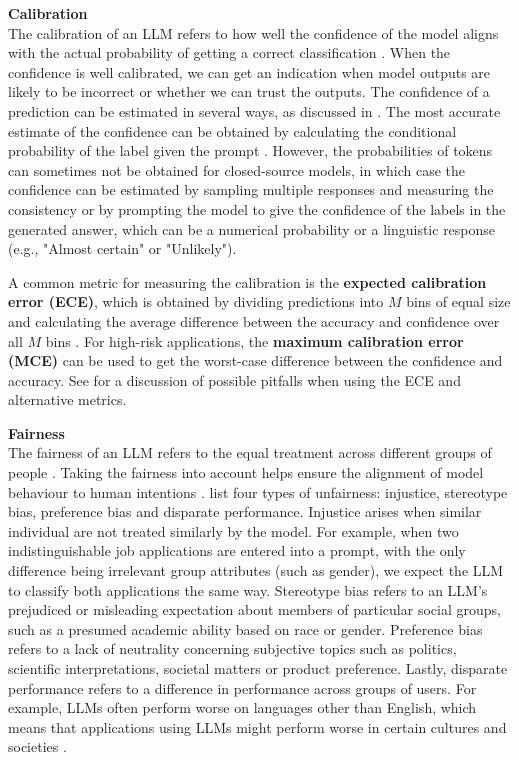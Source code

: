 \documentclass[a4paper]{article}
\begin{document}
\textbf{Calibration}\\
The calibration of an LLM refers to how well the confidence of the model aligns with the actual probability of getting a correct classification \cite{guo2023survey}.  When the confidence is well calibrated, we can get an indication when model outputs are likely to be incorrect or whether we can trust the outputs. The confidence of a prediction can be estimated in several ways, as discussed in \cite{tian2023justaskcalibrationstrategies}.  The most accurate estimate of the confidence can be obtained by calculating the conditional probability of the label given the prompt \cite{xiong2024confidence}. However, the probabilities of tokens can sometimes not be obtained for closed-source models, in which case the confidence can be estimated by sampling multiple responses and measuring the consistency or by prompting the model to give the confidence of the labels in the generated answer, which can be a numerical probability or a linguistic response (e.g., "Almost certain" or "Unlikely").

A common metric for measuring the calibration is the\textbf{ expected calibration error (ECE)}, which is obtained by dividing predictions into $M$ bins of equal size and calculating the average difference between the accuracy and confidence over all $M$ bins \cite{guo2017calibration}. For high-risk applications, the \textbf{maximum calibration error (MCE)} can be used to get the worst-case difference between the confidence and accuracy. See \textcite{nixon2019calibration} for a discussion of possible pitfalls when using the ECE and alternative metrics.

\textbf{Fairness}\\
The fairness of an LLM refers to the equal treatment across different groups of people \cite{chang2023}. Taking the fairness into account helps ensure the alignment of model behaviour to human intentions \cite{kenton2021alignmentlanguageagents}. \citeauthor{liu2024} list four types of unfairness: injustice, stereotype bias, preference bias and disparate performance. Injustice arises when similar individual are not treated similarly by the model. For example, when two indistinguishable job applications are entered into a prompt, with the only difference being irrelevant group attributes (such as gender), we expect the LLM to classify both applications the same way. Stereotype bias refers to an LLM's prejudiced or misleading expectation about members of particular social groups, such as a presumed academic ability based on race or gender. Preference bias refers to a lack of neutrality concerning subjective topics such as politics, scientific interpretations, societal matters or product preference. Lastly, disparate performance refers to a difference in performance across groups of users. For example, LLMs often perform worse on languages other than English, which means that applications using LLMs might perform worse in certain cultures and societies \cite{bang2023multitaskmultilingualmultimodalevaluation}.
\end{document}
